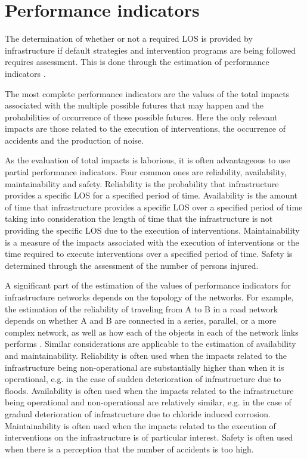 \section{Performance indicators}
The determination of whether or not a required LOS is provided by infrastructure if default strategies and intervention programs are being followed requires assessment. This is done through the estimation of performance indicators \citep{Talvitie1999}.

The most complete performance indicators are the values of the total impacts associated with the multiple possible futures that may happen and the probabilities of occurrence of these possible futures. Here the only relevant impacts are those related to the execution of interventions, the occurrence of accidents and the production of noise.

As the evaluation of total impacts is laborious, it is often advantageous to use partial performance indicators. Four common ones are reliability, availability, maintainability and safety. Reliability is the probability that infrastructure provides a specific LOS for a specified period of time. Availability is the amount of time that infrastructure provides a specific LOS over a specified period of time taking into consideration the length of time that the infrastructure is not providing the specific LOS due to the execution of interventions. Maintainability is a measure of the impacts associated with the execution of interventions or the time required to execute interventions over a specified period of time. Safety is determined through the assessment of the number of persons injured.

A significant part of the estimation of the values of performance indicators for infrastructure networks depends on the topology of the networks.  For example, the estimation of the reliability of traveling from A to B in a road network depends on whether A and B are connected in a series, parallel, or a more complex network, as well as how each of the objects in each of the network links performs \citep{Bell2000}. Similar considerations are applicable to the estimation of availability and maintainability. Reliability is often used when the impacts related to the infrastructure being non-operational are substantially higher than when it is operational, e.g. in the case of sudden deterioration of infrastructure due to floods. Availability is often used when the impacts related to the infrastructure being operational and non-operational are relatively similar, e.g. in the case of gradual deterioration of infrastructure due to chloride induced corrosion. Maintainability is often used when the impacts related to the execution of interventions on the infrastructure is of particular interest. Safety is often used when there is a perception that the number of accidents is too high.

